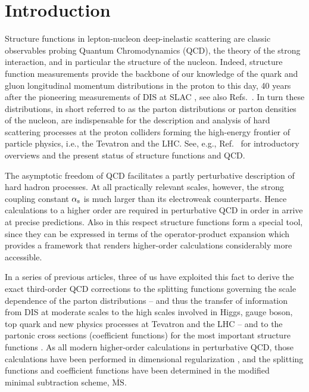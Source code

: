 \documentclass[12pt]{article}
\newcommand{\MSb}{$\overline{\mbox{MS}}$}
\newcommand{\as}{\alpha_{\rm s}}
\begin{document}
\section{Introduction}
\label{sec:intro}
%
%
Structure functions in lepton-nucleon deep-inelastic scattering are 
classic observables probing Quantum Chromodynamics (QCD), the theory of the
strong interaction, and in particular the structure of the nucleon. Indeed,
structure function measurements provide the backbone of our knowledge of the
quark and gluon longitudinal momentum distributions in the proton to this day,
40 years after the pioneering measurements of DIS at SLAC \cite{SLAC-DIS}, see 
also Refs.~\cite{Nobel90}. 
In turn these distributions, in short referred to as the parton distributions 
or parton densities of the nucleon, are indispensable for the description and 
analysis of hard scattering processes at the proton colliders forming the 
high-energy frontier of particle physics, i.e., the {\sc Tevatron} and the LHC.
See, e.g., Ref.~\cite{PDG08} for introductory overviews and the present status 
of structure functions and QCD.

The asymptotic freedom of QCD \cite{AsymptF} facilitates a partly perturbative
description of hard hadron processes. At all practically relevant scales, 
however, the strong coupling constant $\as$ is much larger than its 
electroweak counterparts. Hence calculations to a higher order are required in
perturbative QCD in order in arrive at precise predictions. Also in this 
respect structure functions form a special tool, since they can be expressed 
in terms of the operator-product expansion \cite{OPEstr} which provides a 
framework that renders higher-order calculations considerably more accessible.

In a series of previous articles, three of us have exploited this fact to 
derive the exact third-order QCD corrections to the splitting functions 
governing the scale dependence of the parton distributions \cite{MVV3,MVV4} 
-- and thus the transfer of information from DIS at moderate scales to the 
high scales involved in Higgs, gauge boson, top quark and new physics 
processes at {\sc Tevatron} and the LHC -- 
and to the partonic cross sections (coefficient functions) for the most 
important structure functions \cite{MVV5,MVV6,MVV10}.
%
As all modern higher-order calculations in perturbative QCD, those 
calculations have been performed in dimensional regularization \cite{DimReg}, 
and the splitting functions and coefficient functions have been determined in 
the modified~\cite{BBDM78} minimal subtraction \cite{MS} scheme, \MSb.
\end{document}
